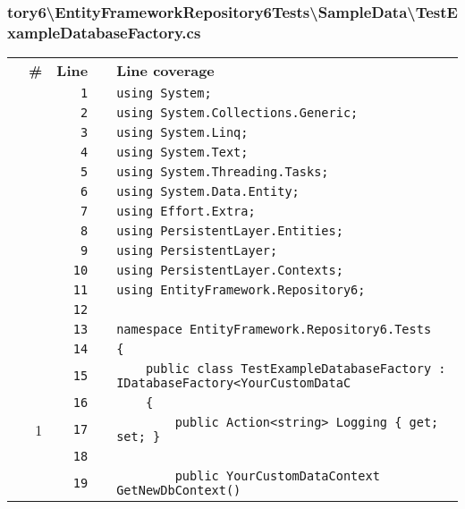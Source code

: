 \documentclass[a4paper,10pt]{article}
\begin{document}
\subsubsection{tory6\textbackslash EntityFrameworkRepository6Tests\textbackslash SampleData\textbackslash TestExampleDatabaseFactory.cs}
\begin{longtable}[l]{lrrll}
\textbf{} & \textbf{\#} & \textbf{Line} & \textbf{} & \textbf{Line coverage}\\
\cellcolor{gray} &  & \verb~1~ & & \verb~using System;~\\
\cellcolor{gray} &  & \verb~2~ & & \verb~using System.Collections.Generic;~\\
\cellcolor{gray} &  & \verb~3~ & & \verb~using System.Linq;~\\
\cellcolor{gray} &  & \verb~4~ & & \verb~using System.Text;~\\
\cellcolor{gray} &  & \verb~5~ & & \verb~using System.Threading.Tasks;~\\
\cellcolor{gray} &  & \verb~6~ & & \verb~using System.Data.Entity;~\\
\cellcolor{gray} &  & \verb~7~ & & \verb~using Effort.Extra;~\\
\cellcolor{gray} &  & \verb~8~ & & \verb~using PersistentLayer.Entities;~\\
\cellcolor{gray} &  & \verb~9~ & & \verb~using PersistentLayer;~\\
\cellcolor{gray} &  & \verb~10~ & & \verb~using PersistentLayer.Contexts;~\\
\cellcolor{gray} &  & \verb~11~ & & \verb~using EntityFramework.Repository6;~\\
\cellcolor{gray} &  & \verb~12~ & & \verb~~\\
\cellcolor{gray} &  & \verb~13~ & & \verb~namespace EntityFramework.Repository6.Tests~\\
\cellcolor{gray} &  & \verb~14~ & & \verb~{~\\
\cellcolor{gray} &  & \verb~15~ & & \verb~    public class TestExampleDatabaseFactory : IDatabaseFactory<YourCustomDataC~\\
\cellcolor{gray} &  & \verb~16~ & & \verb~    {~\\
\cellcolor{green} & 1 & \verb~17~ & & \verb~        public Action<string> Logging { get; set; }~\\
\cellcolor{gray} &  & \verb~18~ & & \verb~~\\
\cellcolor{gray} &  & \verb~19~ & & \verb~        public YourCustomDataContext GetNewDbContext()~\\

\end{longtable}
\end{document}
